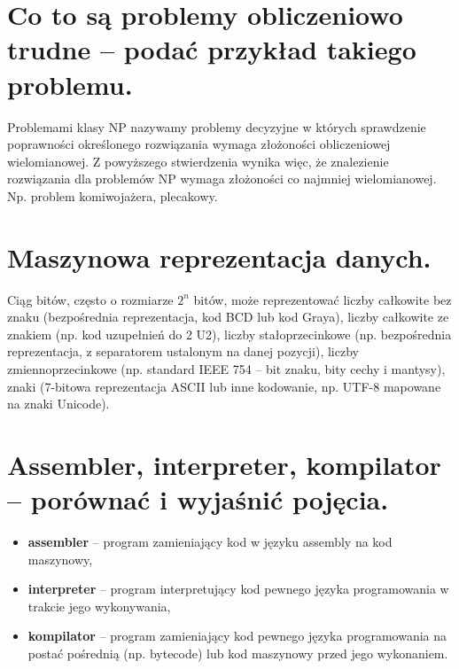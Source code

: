 \documentclass[12pt,a4paper]{article}
\begin{document}
	\section{Co to są problemy obliczeniowo trudne – podać przykład takiego problemu.}
	Problemami klasy NP nazywamy problemy decyzyjne w których sprawdzenie poprawności określonego rozwiązania wymaga złożoności obliczeniowej wielomianowej. Z powyższego stwierdzenia wynika więc, że znalezienie rozwiązania dla problemów NP wymaga złożoności co najmniej wielomianowej. Np. problem komiwojażera, plecakowy.

	\section{Maszynowa reprezentacja danych.}
	Ciąg bitów, często o rozmiarze $2^n$ bitów, może reprezentować liczby całkowite bez znaku (bezpośrednia reprezentacja, kod BCD lub kod Graya), liczby całkowite ze znakiem (np. kod uzupełnień do 2 U2), liczby stałoprzecinkowe (np. bezpośrednia reprezentacja, z separatorem ustalonym na danej pozycji), liczby zmiennoprzecinkowe (np. standard IEEE 754 -- bit znaku, bity cechy i mantysy), znaki (7-bitowa reprezentacja ASCII lub inne kodowanie, np. UTF-8 mapowane na znaki Unicode).

	\section{Assembler, interpreter, kompilator – porównać i wyjaśnić pojęcia.}
	\begin{itemize}	
		\item \textbf{assembler} -- program zamieniający kod w języku assembly na kod maszynowy,
		\item \textbf{interpreter} -- program interpretujący kod pewnego języka programowania w trakcie jego wykonywania,
		\item \textbf{kompilator} -- program zamieniający kod pewnego języka programowania na postać pośrednią (np. bytecode) lub kod maszynowy przed jego wykonaniem.
	\end{itemize}	
\end{document}
